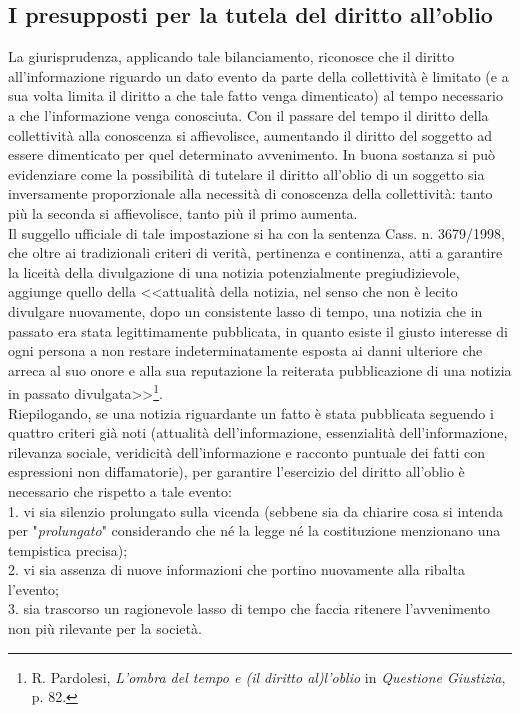 \subsection{I presupposti per la tutela del diritto all'oblio}
La giurisprudenza, applicando tale bilanciamento, riconosce che il diritto all'informazione riguardo un dato evento da parte della collettività è limitato (e a sua volta limita il diritto a che tale fatto venga dimenticato) al tempo necessario a che l'informazione venga conosciuta. Con il passare del tempo il diritto della collettività alla conoscenza si affievolisce, aumentando il diritto del soggetto ad essere dimenticato per quel determinato avvenimento.
In buona sostanza si può evidenziare come la possibilità di tutelare il diritto all'oblio di un soggetto sia inversamente proporzionale alla necessità di conoscenza della collettività: tanto più la seconda si affievolisce, tanto più il primo aumenta.
\\Il suggello ufficiale di tale impostazione si ha con la sentenza Cass. n. 3679/1998, che oltre ai tradizionali criteri di verità, pertinenza e continenza, atti a garantire la liceità della divulgazione di una notizia potenzialmente pregiudizievole, aggiunge quello della <<attualità della notizia, nel senso che non è lecito divulgare nuovamente, dopo un consistente lasso di tempo, una notizia che in passato era stata legittimamente pubblicata, in quanto esiste il giusto interesse di ogni persona a non restare indeterminatamente esposta ai danni ulteriore che arreca al suo onore e alla sua reputazione la reiterata pubblicazione di una notizia in passato divulgata>>\footnote{R. Pardolesi, \textit{L'ombra del tempo e (il diritto al)l'oblio} in \textit{Questione Giustizia}, p. 82.}.
\\Riepilogando, se una notizia riguardante un fatto è stata pubblicata seguendo i quattro criteri già noti (attualità dell'informazione, essenzialità dell'informazione, rilevanza sociale, veridicità dell'informazione e racconto puntuale dei fatti con espressioni non diffamatorie), per garantire l'esercizio del diritto all'oblio è necessario che rispetto a tale evento:
\\1. vi sia silenzio prolungato sulla vicenda (sebbene sia da chiarire cosa si intenda per "\textit{prolungato}" considerando che né la legge né la costituzione menzionano una tempistica precisa);
\\2. vi sia assenza di nuove informazioni che portino nuovamente alla ribalta l'evento;
\\3. sia trascorso un ragionevole lasso di tempo che faccia ritenere l'avvenimento non più rilevante per la società.
